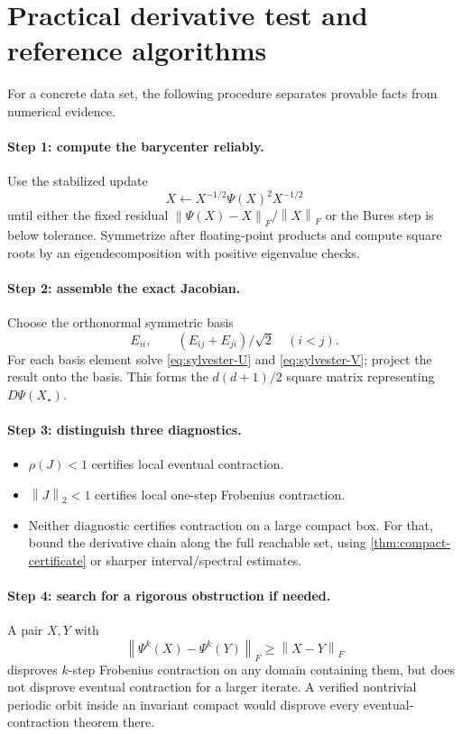 \documentclass[11pt]{article}
\theoremstyle{definition}
\newcommand{\rhoop}{\rho}
\newcommand{\norm}[1]{\left\lVert #1\right\rVert}
\begin{document}
\section{Practical derivative test and reference algorithms}

For a concrete data set, the following procedure separates provable facts
from numerical evidence.

\paragraph{Step 1: compute the barycenter reliably.}
Use the stabilized update
\[
 X\leftarrow X^{-1/2}\Psi(X)^2X^{-1/2}
\]
until either the fixed residual $\norm{\Psi(X)-X}_F/\norm X_F$ or the Bures
step is below tolerance.  Symmetrize after floating-point products and compute
square roots by an eigendecomposition with positive eigenvalue checks.

\paragraph{Step 2: assemble the exact Jacobian.}
Choose the orthonormal symmetric basis
\[
 E_{ii},\qquad (E_{ij}+E_{ji})/\sqrt2\quad(i<j).
\]
For each basis element solve \eqref{eq:sylvester-U} and
\eqref{eq:sylvester-V}; project the result onto the basis.  This forms the
$d(d+1)/2$ square matrix representing $D\Psi(X_\star)$.

\paragraph{Step 3: distinguish three diagnostics.}
\begin{itemize}
  \item $\rhoop(J)<1$ certifies local eventual contraction.
  \item $\norm J_2<1$ certifies local one-step Frobenius contraction.
  \item Neither diagnostic certifies contraction on a large compact box.
  For that, bound the derivative chain along the full reachable set, using
  \cref{thm:compact-certificate} or sharper interval/spectral estimates.
\end{itemize}

\paragraph{Step 4: search for a rigorous obstruction if needed.}
A pair $X,Y$ with
\[
 \norm{\Psi^k(X)-\Psi^k(Y)}_F\geq\norm{X-Y}_F
\]
disproves $k$-step Frobenius contraction on any domain containing them, but
does not disprove eventual contraction for a larger iterate.  A verified
nontrivial periodic orbit inside an invariant compact would disprove every
eventual-contraction theorem there.
\end{document}
